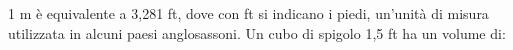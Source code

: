 1 m è equivalente a 3,281 ft, dove con ft si indicano i piedi, un'unità di misura utilizzata in alcuni paesi anglosassoni. Un cubo di spigolo 1,5 ft ha un volume di: